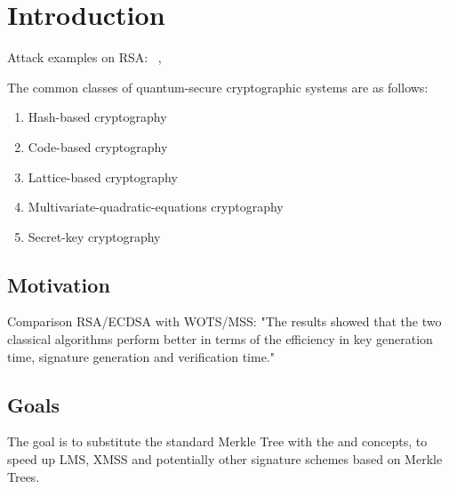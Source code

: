 \chapter{Introduction}
\label{cha:introduction}
Attack examples on RSA: ~\cite{RSA_pq-attack_examples_2018}, \cite{RSA_pq-attack_without_factorization_2018}

The common classes of quantum-secure cryptographic systems are as follows:~\cite{book_pqc_bernstein_2004}
\begin{enumerate}
\item Hash-based cryptography
\item Code-based cryptography
\item Lattice-based cryptography
\item Multivariate-quadratic-equations cryptography
\item Secret-key cryptography
\end{enumerate}

\section{Motivation}

Comparison RSA/ECDSA with WOTS/MSS:
"The results showed that the two classical algorithms perform better in terms of the efficiency in key generation time, signature generation and verification time."~\cite{comparison_performance_RSA_ECDSA_Merkle_WOTS_2021}


\section{Goals}


The goal is to substitute the standard Merkle Tree with the \tftree and \extree concepts, to speed up LMS, XMSS and potentially other signature schemes based on Merkle Trees.